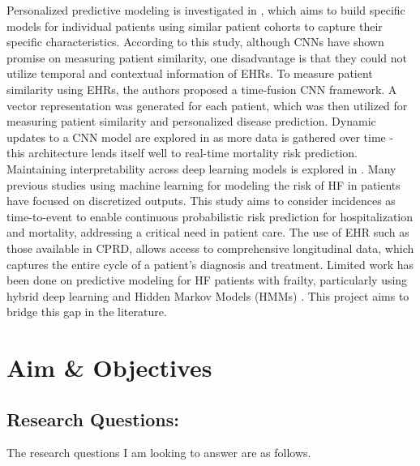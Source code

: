 \documentclass[%
 reprint,
 amsmath,amssymb,
 aps,
 nofootinbib,
]{revtex4-2}
\theoremstyle{definition}
\begin{document}
Personalized predictive modeling is investigated in \citep{suo2017personalized}, which aims to build specific models for individual patients using similar patient cohorts to capture their specific characteristics. According to this study, although CNNs have shown promise on measuring patient similarity, one disadvantage is that they could not utilize temporal and contextual information of EHRs. To measure patient similarity using EHRs, the authors proposed a time-fusion CNN framework. A vector representation was generated for each patient, which was then utilized for measuring patient similarity and personalized disease prediction. Dynamic updates to a CNN model are explored in \citep{brand2018real} as more data is gathered over time - this architecture lends itself well to real-time mortality risk prediction.\\

Maintaining interpretability across deep learning models is explored in \citep{caicedo2019iseeu}. Many previous studies using machine learning for modeling the risk of HF in patients have focused on discretized outputs. This study aims to consider incidences as time-to-event to enable continuous probabilistic risk prediction for hospitalization and mortality, addressing a critical need in patient care. The use of EHR such as those available in CPRD, allows access to comprehensive longitudinal data, which captures the entire cycle of a patient's diagnosis and treatment. Limited work has been done on predictive modeling for HF patients with frailty, particularly using hybrid deep learning and Hidden Markov Models (HMMs) \cite{rabiner_1990}. This project aims to bridge this gap in the literature.

\section{\label{aimsobj}Aim \& Objectives}

\subsection{Research Questions:}
The research questions I am looking to answer  are as follows.
\end{document}
